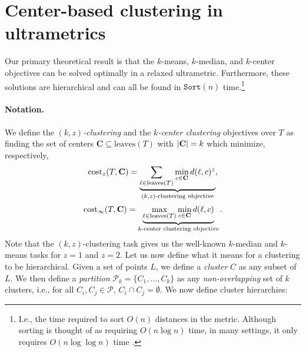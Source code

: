 \section{Center-based clustering in ultrametrics}
\label{sec:clustering_theory}
%
Our primary theoretical result is that the $k$-means, $k$-median, and $k$-center objectives can be solved optimally in a relaxed ultrametric. Furthermore, these solutions are hierarchical and can all be found in $\texttt{Sort}(n)$ time.\footnote{ I.e., the time required to sort $O(n)$ distances in the metric. Although sorting is thought of as requiring $O(n \log n)$ time, in many settings, it only requires $O(n \log \log n)$ time \citep{sort_time}.}
%
\paragraph{Notation.} We define the \emph{$(k, z)$-clustering} and the \emph{$k$-center clustering} objectives over $T$ as finding the set of centers $\mathbf{C} \subseteq \text{leaves}(T)$ with $|\mathbf{C}| = k$ which minimize, respectively, 
\[\text{cost}_z(T, \mathbf{C}) = \underbrace{ \sum_{\ell \in \text{leaves}(T)} \min_{c \in \mathbf{C}} d(\ell, c)^z}_{(k, z)\text{-clustering objective}},\]
%
\[\text{cost}_\infty(T, \mathbf{C}) = \underbrace{\max_{\ell \in \text{leaves}(T)} \min_{c \in \mathbf{C}} d(\ell, c)}_{k\text{-center clustering objective}}.\]
%
Note that the $(k, z)$-clustering task gives us the well-known $k$-median and $k$-means tasks for $z=1$ and $z=2$. Let us now define what it means for a clustering to be hierarchical. Given a set of points $L$, we define a \emph{cluster} $C$ as any subset of $L$. We then define a \emph{partition} $\mathcal{P}_k = \{C_1, \ldots, C_k\}$ as any \emph{non-overlapping} set of $k$ clusters, i.e., for all $C_i, C_j \in \mathcal{P}$, $C_i \cap C_j = \emptyset$. We now define cluster hierarchies:%



